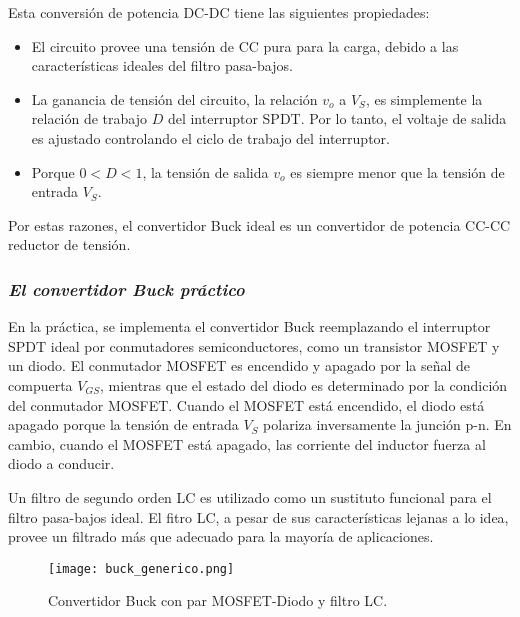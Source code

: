 Esta conversión de potencia DC-DC tiene las siguientes propiedades:
\begin{itemize}[noitemsep]
    \item El circuito provee una tensión de CC pura para la carga, debido a las características ideales del filtro pasa-bajos.
    \item La ganancia de tensión del circuito, la relación $v_o$ a $V_S$, es simplemente la relación de trabajo $D$ del interruptor SPDT. Por lo tanto, el voltaje de salida
    es ajustado controlando el ciclo de trabajo del interruptor.
    \item Porque $0 < D < 1$, la tensión de salida $v_o$ es siempre menor que la tensión de entrada $V_S$.
\end{itemize}

Por estas razones, el convertidor Buck ideal es un convertidor de potencia CC-CC reductor de tensión.

\subsubsection*{\it{El convertidor Buck práctico}}
\vspace{-0.25cm}
En la práctica, se implementa el convertidor Buck reemplazando el interruptor SPDT ideal por conmutadores semiconductores, como un transistor MOSFET y un diodo.
El conmutador MOSFET es encendido y apagado por la señal de compuerta $V_{GS}$, mientras que el estado del diodo es determinado por la condición del conmutador MOSFET.
Cuando el MOSFET está encendido, el diodo está apagado porque la tensión de entrada $V_S$ polariza inversamente la junción p-n. En cambio, cuando el MOSFET está apagado,
las corriente del inductor fuerza al diodo a conducir.

Un filtro de segundo orden LC es utilizado como un sustituto funcional para el filtro pasa-bajos ideal. El fitro LC, a pesar de sus características lejanas a lo idea, provee
un filtrado más que adecuado para la mayoría de aplicaciones.

\begin{figure}[H]
    \centering
    \texttt{[image: buck\_generico.png]}
    \vspace{-0.25cm}
    \caption{Convertidor Buck con par MOSFET-Diodo y filtro LC.}
    \label{fig:buck_practico}
\end{figure}
\vspace{-0.5cm}
\parencite{CHOI} %
